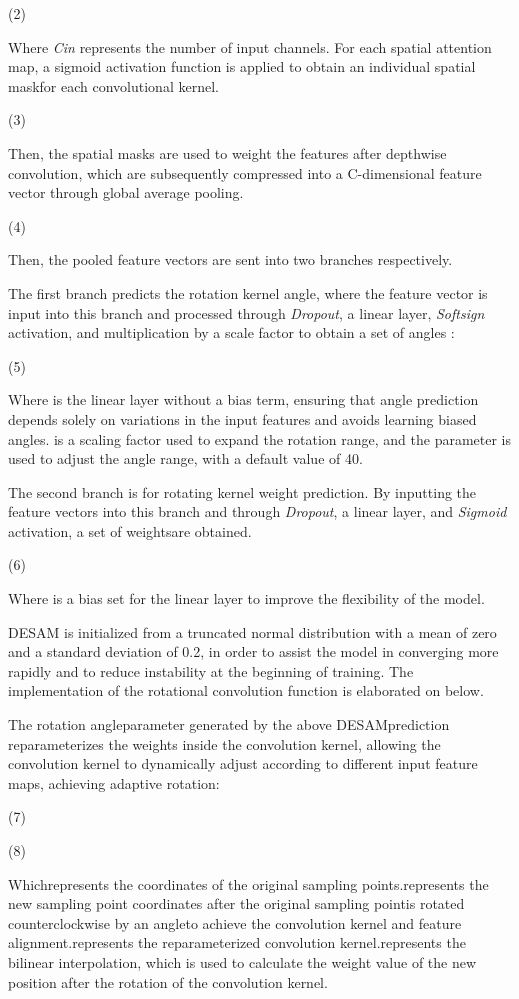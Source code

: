\documentclass[10pt,twocolumn,final]{article}
\begin{document}
	(2)

Where \textit{C}\textit{in} represents the number of input channels. For each spatial attention map, a sigmoid activation function is applied to obtain an individual spatial maskfor each convolutional kernel.

	(3)

Then, the spatial masks are used to weight the features after depthwise convolution, which are subsequently compressed into a C-dimensional feature vector through global average pooling.

	(4)

Then, the pooled feature vectors are sent into two branches respectively.

The first branch predicts the rotation kernel angle, where the feature vector is input into this branch and processed through \textit{Dropout}, a linear layer, \textit{Softsign} activation, and multiplication by a scale factor to obtain a set of angles :

	(5)

Where is the linear layer without a bias term, ensuring that angle prediction depends solely on variations in the input features and avoids learning biased angles.  is a scaling factor used to expand the rotation range, and the parameter  is used to adjust the angle range, with a default value of 40.

	The second branch is for rotating kernel weight prediction. By inputting the feature vectors into this branch and through \textit{Dropout}, a linear layer, and \textit{Sigmoid} activation, a set of weightsare obtained.

	(6)

	Where  is a bias set for the linear layer to improve the flexibility of the model.

DESAM is initialized from a truncated normal distribution with a mean of zero and a standard deviation of 0.2, in order to assist the model in converging more rapidly and to reduce instability at the beginning of training. The implementation of the rotational convolution function is elaborated on below.

The rotation angleparameter generated by the above DESAMprediction reparameterizes the weights inside the convolution kernel, allowing the convolution kernel to dynamically adjust according to different input feature maps, achieving adaptive rotation:

	(7)

	(8)

	Whichrepresents the coordinates of the original sampling points.represents the new sampling point coordinates after the original sampling pointis rotated counterclockwise by an angleto achieve the convolution kernel and feature alignment.represents the reparameterized convolution kernel.represents the bilinear interpolation, which is used to calculate the weight value of the new position after the rotation of the  convolution kernel.
\end{document}
